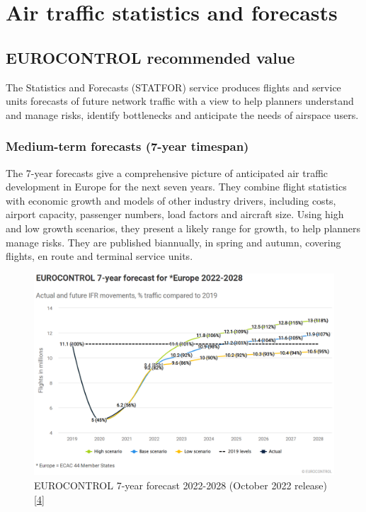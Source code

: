 \documentclass[
  11pt,
  a4paper,
]{book}
\begin{document}
\hypertarget{sec-air-traffic-statistics-and-forecasts}{%
\chapter{Air traffic statistics and
forecasts}\label{sec-air-traffic-statistics-and-forecasts}}

\hypertarget{eurocontrol-recommended-value}{%
\section{EUROCONTROL recommended
value}\label{eurocontrol-recommended-value}}

The Statistics and Forecasts (STATFOR) service produces flights and
service units forecasts of future network traffic with a view to help
planners understand and manage risks, identify bottlenecks and
anticipate the needs of airspace users.

\hypertarget{medium-term-forecasts-7-year-timespan}{%
\subsection{Medium-term forecasts (7-year
timespan)}\label{medium-term-forecasts-7-year-timespan}}

The 7-year forecasts give a comprehensive picture of anticipated air
traffic development in Europe for the next seven years. They combine
flight statistics with economic growth and models of other industry
drivers, including costs, airport capacity, passenger numbers, load
factors and aircraft size. Using high and low growth scenarios, they
present a likely range for growth, to help planners manage risks. They
are published biannually, in spring and autumn, covering flights, en
route and terminal service units.

\begin{figure}

{\centering \includegraphics{./figures/forecast_2022-2028.png}

}

\caption{\label{fig-forecast-2022-2028-plot}EUROCONTROL 7-year forecast
2022-2028 (October 2022 release)
\protect\hyperlink{ref-statfor:7year_forecast:2022-2028}{{[}4{]}}}

\end{figure}
\end{document}
